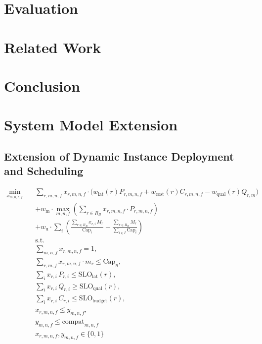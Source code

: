 \documentclass[letterpaper, anonymous, twocolumn, 10pt]{article}
\begin{document}
\section{Evaluation} \label{section:evaluation}

\section{Related Work}\label{section:related_work}

\section{Conclusion}


{



\appendix
\section{System Model Extension}
\subsection{Extension of Dynamic Instance Deployment and Scheduling} \label{append:dynamic-scheduling}
\begin{equation}
\begin{aligned}
\min_{x_{m, n, r,f}} \quad & \sum_{r,m,n,f} x_{r,m,n,f} \cdot \Big(w_{\text{lat}}(r) P_{r,m,n,f} + w_{\text{cost}}(r) C_{r,m,n,f} - w_{\text{qual}}(r) Q_{r,m} \Big) \nonumber \\
& + w_{\text{m}} \cdot \max_{m,n,f} \left( \sum_{r \in R_B} x_{r,m,n,f} \cdot P_{r,m,n,f} \right) \nonumber \\
& + w_{\text{u}} \cdot \sum_i\left( \frac{\sum_{r\in R_B} x_{r,i} \, M_r}{\mathrm{Cap}_i} - \frac{\sum_{r \in R_B} M_r}{\sum_{i \in I} \mathrm{Cap}_i}\right) \\
& \text{s.t.} \\
& \sum_{m,n,f} x_{r,m,n,f} = 1,\\
& \sum_{r,m,f} x_{r,m,n,f} \cdot m_r \le \text{Cap}_n,  \nonumber \\
& \sum_{i} x_{r,i} \, P_{r,i} \le \mathrm{SLO}_{\text{lat}}(r), \nonumber\\
& \sum_{i} x_{r,i} \, Q_{r,i} \ge \mathrm{SLO}_{\text{qual}}(r), \nonumber\\
& \sum_{i} x_{r,i} \, C_{r,i} \le \mathrm{SLO}_{\text{budget}}(r), \nonumber\\
& x_{r,m,n,f} \le y_{m,n,f}, \nonumber \\
& y_{m,n,f} \le \text{compat}_{m,n,f} \nonumber \\
& x_{r,m,n,f}, y_{m,n,f} \in \{0,1\}\\
\end{aligned}
\end{equation}

}
\end{document}
